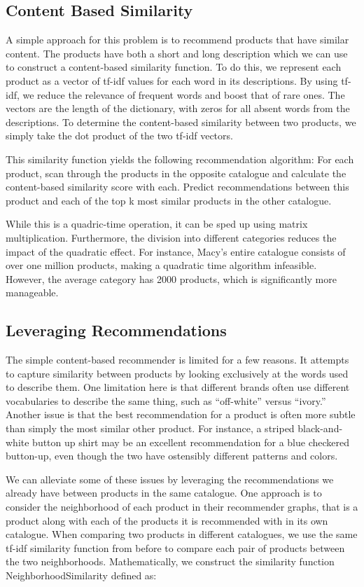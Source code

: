 \documentclass[11pt]{article}
\begin{document}
\subsection*{Content Based Similarity}
A simple approach for this problem is to recommend products that have similar
content. The products have both a short and long description which we can use to
construct a content-based similarity function. To do this, we represent each
product as a vector of tf-idf values for each word in its descriptions. By using
tf-idf, we reduce the relevance of frequent words and boost that of rare ones.
The vectors are the length of the dictionary, with zeros for all absent words
from the descriptions. To determine the content-based similarity between two
products, we simply take the dot product of the two tf-idf vectors. 

This similarity function yields the following recommendation algorithm: For each
product, scan through the products in the opposite catalogue and calculate the
content-based similarity score with each. Predict recommendations between this
product and each of the top k most similar products in the other catalogue.

While this is a quadric-time operation, it can be sped up using matrix
multiplication. Furthermore, the division into different categories reduces the
impact of the quadratic effect. For instance, Macy's entire catalogue consists
of over one million products, making a quadratic time algorithm infeasible.
However, the average category has 2000 products, which is significantly more
manageable.

\subsection*{Leveraging Recommendations}
The simple content-based recommender is limited for a few reasons. It attempts
to capture similarity between products by looking exclusively at the words used
to describe them. One limitation here is that different brands often use
different vocabularies to describe the same thing, such as ``off-white'' versus
``ivory.'' Another issue is that the best recommendation for a product is often
more subtle than simply the most similar other product. For instance, a striped
black-and-white button up shirt may be an excellent recommendation for a blue
checkered button-up, even though the two have ostensibly different patterns and
colors. 

We can alleviate some of these issues by leveraging the recommendations we
already have between products in the same catalogue. One approach is to consider
the neighborhood of each product in their recommender graphs, that is a product
along with each of the products it is recommended with in its own catalogue.
When comparing two products in different catalogues, we use the same tf-idf
similarity function from before to compare each pair of products between the two
neighborhoods. Mathematically, we construct the similarity function
NeighborhoodSimilarity defined as:
\end{document}
